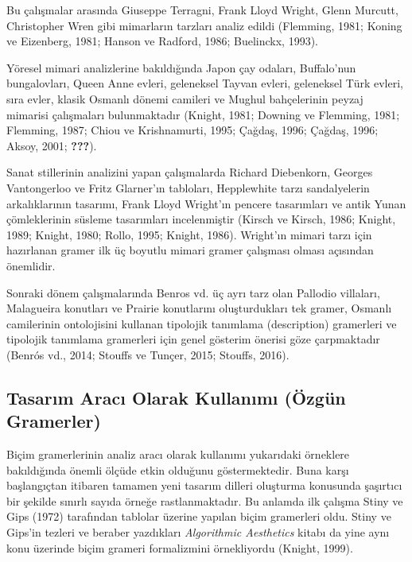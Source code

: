 \documentclass[12pt,turkish,a4paperpaper,]{report}
\begin{document}
Bu çalışmalar arasında Giuseppe Terragni, Frank Lloyd Wright, Glenn
Murcutt, Christopher Wren gibi mimarların tarzları analiz edildi
(Flemming, 1981; Koning ve Eizenberg, 1981; Hanson ve Radford, 1986;
Buelinckx, 1993).

Yöresel mimari analizlerine bakıldığında Japon çay odaları, Buffalo'nun
bungalovları, Queen Anne evleri, geleneksel Tayvan evleri, geleneksel
Türk evleri, sıra evler, klasik Osmanlı dönemi camileri ve Mughul
bahçelerinin peyzaj mimarisi çalışmaları bulunmaktadır (Knight, 1981;
Downing ve Flemming, 1981; Flemming, 1987; Chiou ve Krishnamurti, 1995;
Çağdaş, 1996; Çağdaş, 1996; Aksoy, 2001; {\textbf{???}}).

Sanat stillerinin analizini yapan çalışmalarda Richard Diebenkorn,
Georges Vantongerloo ve Fritz Glarner'ın tabloları, Hepplewhite tarzı
sandalyelerin arkalıklarının tasarımı, Frank Lloyd Wright'ın pencere
tasarımları ve antik Yunan çömleklerinin süsleme tasarımları
incelenmiştir (Kirsch ve Kirsch, 1986; Knight, 1989; Knight, 1980;
Rollo, 1995; Knight, 1986). Wright'ın mimari tarzı için hazırlanan
gramer ilk üç boyutlu mimari gramer çalışması olması açısından
önemlidir.

Sonraki dönem çalışmalarında Benros vd. üç ayrı tarz olan Pallodio
villaları, Malagueira konutları ve Prairie konutlarını oluşturdukları
tek gramer, Osmanlı camilerinin ontolojisini kullanan tipolojik
tanımlama (description) gramerleri ve tipolojik tanımlama gramerleri
için genel gösterim önerisi göze çarpmaktadır (Benrós vd., 2014; Stouffs
ve Tunçer, 2015; Stouffs, 2016).

\hypertarget{tasarux131m-aracux131-olarak-kullanux131mux131-uxf6zguxfcn-gramerler}{%
\subsection{Tasarım Aracı Olarak Kullanımı (Özgün
Gramerler)}\label{tasarux131m-aracux131-olarak-kullanux131mux131-uxf6zguxfcn-gramerler}}

Biçim gramerlerinin analiz aracı olarak kullanımı yukarıdaki örneklere
bakıldığında önemli ölçüde etkin olduğunu göstermektedir. Buna karşı
başlangıçtan itibaren tamamen yeni tasarım dilleri oluşturma konusunda
şaşırtıcı bir şekilde sınırlı sayıda örneğe rastlanmaktadır. Bu anlamda
ilk çalışma Stiny ve Gips (1972) tarafından tablolar üzerine yapılan
biçim gramerleri oldu. Stiny ve Gips'in tezleri ve beraber yazdıkları
\emph{Algorithmic Aesthetics} kitabı da yine aynı konu üzerinde biçim
grameri formalizmini örnekliyordu (Knight, 1999).
\end{document}
